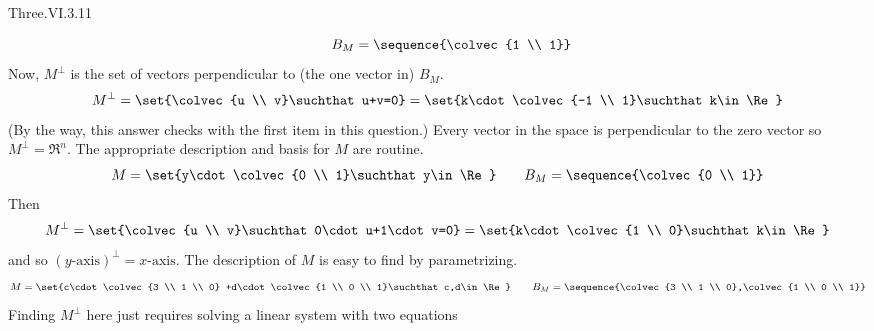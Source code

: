 \begin{ans}{Three.VI.3.11}
\begin{exparts}
\begin{equation*}
              \qquad
              B_M=\sequence{\colvec{1 \\ 1}}
            \end{equation*}
            Now, $M^\perp$ is the set of vectors perpendicular to (the one
            vector in) $B_M$.
            \begin{equation*}
              M^\perp
              =\set{\colvec{u \\ v}\suchthat u+v=0}
              =\set{k\cdot\colvec{-1 \\ 1}\suchthat k\in\Re}
            \end{equation*}
            (By the way, this answer checks with the first item in this
            question.)
          \partsitem Every vector in the space is perpendicular to the zero
            vector so $M^\perp=\Re^n$.
          \partsitem The appropriate description and basis for $M$ are routine.
            \begin{equation*}
              M=\set{y\cdot\colvec{0 \\ 1}\suchthat y\in\Re}
              \qquad
              B_M=\sequence{\colvec{0 \\ 1}}
            \end{equation*}
            Then
            \begin{equation*}
              M^\perp
              =\set{\colvec{u \\ v}\suchthat 0\cdot u+1\cdot v=0}
              =\set{k\cdot\colvec{1 \\ 0}\suchthat k\in\Re}
            \end{equation*}
            and so $(\text{$y$-axis})^\perp=\text{$x$-axis}$.
          \partsitem The description of $M$ is easy to find by parametrizing.
            \begin{equation*}
              M=\set{c\cdot\colvec{3 \\ 1 \\ 0}
                     +d\cdot\colvec{1 \\ 0 \\ 1}\suchthat c,d\in\Re}
              \qquad
              B_M=\sequence{\colvec{3 \\ 1 \\ 0},\colvec{1 \\ 0 \\ 1}}
            \end{equation*}
            Finding $M^\perp$ here just requires solving a linear system
            with two equations
            \begin{equation*}

\end{equation*}
\end{exparts}
\end{ans}
